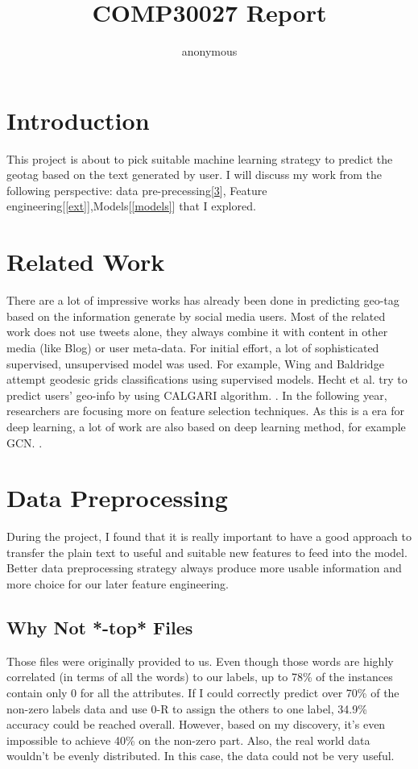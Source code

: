 \documentclass[11pt]{article}
\author{anonymous}
\title{COMP30027 Report}
\begin{document}
\maketitle

\section{Introduction}
This project is about to pick suitable machine learning strategy to
predict the geotag based on the text generated by user. I will discuss my work 
from the following perspective:
data pre-precessing[\ref{sec2}], Feature engineering[\ref{ext}],Models[\ref{models}] that I explored.

\section{Related Work}
There are a lot of impressive works has already been done in predicting geo-tag based on the information
generate by social media users. 
Most of the related work does not use tweets alone, they always combine it with content in other
media (like Blog) or user meta-data.
For initial effort, a lot of sophisticated supervised, unsupervised 
model was used. For example, Wing and Baldridge attempt geodesic grids classifications 
using supervised models. Hecht et al. try to predict users' geo-info by using CALGARI algorithm.
. 
In the following year, researchers are focusing more on feature selection techniques. As this is a
era for deep learning, a lot of work are also based on deep learning method, for example GCN.
.


\section{Data Preprocessing}
\label{sec2}
During the project, I found that it is really important to have a good approach to transfer 
the plain text to useful and suitable new features to feed into the model.
Better data preprocessing strategy always produce more usable information 
and more choice for our later feature engineering.

\subsection{Why Not *-top* Files}
Those files were originally provided to us. Even though those words
are highly correlated (in terms of all the words) to our labels, up to 78\% of the 
instances contain only 0 for all the attributes. If I could 
correctly predict over 70\% of the non-zero labels data and use 
0-R to assign the others to one label, 34.9\% accuracy could be 
reached overall. However, based on my discovery, it's even impossible to achieve
40\% on the non-zero part. Also, the real world
data wouldn't be evenly distributed. In this case, the data could not be very useful.
\end{document}
